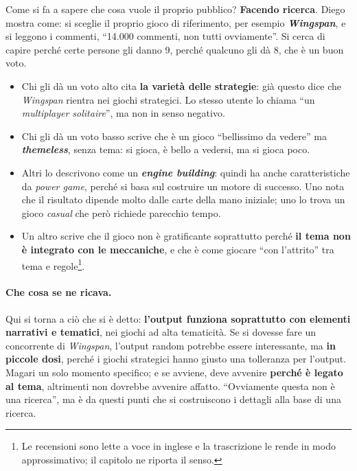 Come si fa a sapere che cosa vuole il proprio pubblico? \textbf{Facendo ricerca}. Diego mostra
come: si sceglie il proprio gioco di riferimento, per esempio \textbf{\emph{Wingspan}}, e si
leggono i commenti, ``14.000 commenti, non tutti ovviamente''. Si cerca di capire perché certe
persone gli danno 9, perché qualcuno gli dà 8, che è un buon voto.
\begin{itemize}
  \item Chi gli dà un voto alto cita \textbf{la varietà delle strategie}: già questo dice che
        \emph{Wingspan} rientra nei giochi strategici. Lo stesso utente lo chiama ``un
        \emph{multiplayer solitaire}'', ma non in senso negativo.
  \item Chi gli dà un voto basso scrive che è un gioco ``bellissimo da vedere'' ma
        \textbf{\emph{themeless}}, senza tema: si gioca, è bello a vedersi, ma si gioca poco.
  \item Altri lo descrivono come un \textbf{\emph{engine building}}: quindi ha anche
        caratteristiche da \emph{power game}, perché si basa sul costruire un motore di
        successo. Uno nota che il risultato dipende molto dalle carte della mano iniziale; uno
        lo trova un gioco \emph{casual} che però richiede parecchio tempo.
  \item Un altro scrive che il gioco non è gratificante soprattutto perché \textbf{il tema non è
        integrato con le meccaniche}, e che è come giocare ``con l'attrito'' tra tema e
        regole\footnote{Le recensioni sono lette a voce in inglese e la trascrizione le rende
        in modo approssimativo; il capitolo ne riporta il senso.}.
\end{itemize}

\paragraph{Che cosa se ne ricava.} Qui si torna a ciò che si è detto: \textbf{l'output
funziona soprattutto con elementi narrativi e tematici}, nei giochi ad alta tematicità. Se si
dovesse fare un concorrente di \emph{Wingspan}, l'output random potrebbe essere interessante,
ma \textbf{in piccole dosi}, perché i giochi strategici hanno giusto una tolleranza per
l'output. Magari un solo momento specifico; e se avviene, deve avvenire \textbf{perché è legato
al tema}, altrimenti non dovrebbe avvenire affatto. ``Ovviamente questa non è una ricerca'', ma
è da questi punti che si costruiscono i dettagli alla base di una ricerca.

